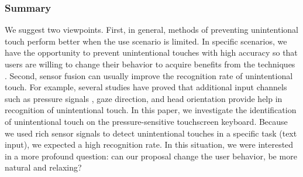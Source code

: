 

\subsubsection{Summary}

We suggest two viewpoints. First, in general, methods of preventing unintentional touch perform better when the use scenario is limited. In specific scenarios, we have the opportunity to prevent unintentional touches with high accuracy so that users are willing to change their behavior to acquire benefits from the techniques \cite{2013-TapBoard,2016-TapBoard2,2014-PenMightier}. Second, sensor fusion can usually improve the recognition rate of unintentional touch. For example, several studies have proved that additional input channels such as pressure signals \cite{2015-GestureOn}, gaze direction, and head orientation \cite{2020-TabletopTouch} provide help in recognition of unintentional touch. In this paper, we investigate the identification of unintentional touch on the pressure-sensitive touchscreen keyboard. Because we used rich sensor signals to detect unintentional touches in a specific task (text input), we expected a high recognition rate. In this situation, we were interested in a more profound question: can our proposal change the user behavior, be more natural and relaxing?


